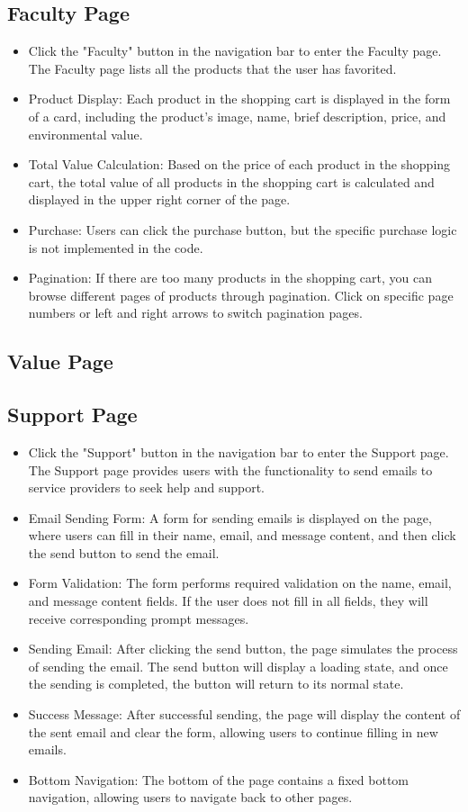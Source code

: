 \documentclass{article}
\begin{document}
\subsection{Faculty Page}
\begin{itemize}
    \item Click the "Faculty" button in the navigation bar to enter the Faculty page. The Faculty page lists all the products that the user has favorited.
    \item Product Display: Each product in the shopping cart is displayed in the form of a card, including the product's image, name, brief description, price, and environmental value.
    \item Total Value Calculation: Based on the price of each product in the shopping cart, the total value of all products in the shopping cart is calculated and displayed in the upper right corner of the page.
    \item Purchase: Users can click the purchase button, but the specific purchase logic is not implemented in the code.
    \item Pagination: If there are too many products in the shopping cart, you can browse different pages of products through pagination. Click on specific page numbers or left and right arrows to switch pagination pages.
\end{itemize}

\subsection{Value Page}

\subsection{Support Page}
\begin{itemize}
    \item Click the "Support" button in the navigation bar to enter the Support page. The Support page provides users with the functionality to send emails to service providers to seek help and support.
    \item Email Sending Form: A form for sending emails is displayed on the page, where users can fill in their name, email, and message content, and then click the send button to send the email.
    \item Form Validation: The form performs required validation on the name, email, and message content fields. If the user does not fill in all fields, they will receive corresponding prompt messages.
    \item Sending Email: After clicking the send button, the page simulates the process of sending the email. The send button will display a loading state, and once the sending is completed, the button will return to its normal state.
    \item Success Message: After successful sending, the page will display the content of the sent email and clear the form, allowing users to continue filling in new emails.
    \item Bottom Navigation: The bottom of the page contains a fixed bottom navigation, allowing users to navigate back to other pages.
\end{itemize}
\end{document}
